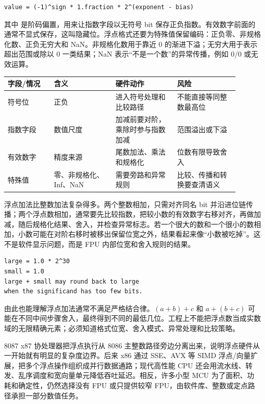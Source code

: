 \begin{lstlisting}
value = (-1)^sign * 1.fraction * 2^(exponent - bias)
\end{lstlisting}

其中  是阶码偏置，用来让指数字段以无符号 bit 保存正负指数。有效数字前面的  通常不显式保存，这叫隐藏位。浮点格式还要为特殊值保留编码：正负零、非规格化数、正负无穷大和 NaN。非规格化数用于靠近 0 的渐进下溢；无穷大用于表示超出范围或除以 0 一类结果；NaN 表示“不是一个数”的异常传播，例如 $0/0$ 或无效运算。

\begin{longtable}{L{0.18\linewidth}L{0.24\linewidth}L{0.24\linewidth}L{0.24\linewidth}}
\toprule
字段/情况 & 含义 & 硬件动作 & 风险 \\
\midrule
符号位 & 正负 & 进入符号处理和比较路径 & 不能直接等同整数最高位 \\
指数字段 & 数值尺度 & 加减前要对阶，乘除时参与指数加减 & 范围溢出或下溢 \\
有效数字 & 精度来源 & 尾数加法、乘法和规格化 & 位数有限导致舍入 \\
特殊值 & 零、非规格化、Inf、NaN & 需要旁路和异常规则 & 比较、传播和转换要查清语义 \\
\bottomrule
\end{longtable}

浮点加法比整数加法复杂得多。两个整数相加，只需对齐同名 bit 并沿进位链传播；两个浮点数相加，通常要先比较指数，把较小数的有效数字右移对齐，再做加减，随后规格化结果、舍入，并检查异常标志。若一个很大的数和一个很小的数相加，小数可能在对阶右移时被移出保留位宽之外，结果看起来像“小数被吃掉”。这不是软件显示问题，而是 FPU 内部位宽和舍入规则的结果。

\begin{lstlisting}
large = 1.0 * 2^30
small = 1.0
large + small may round back to large
when the significand has too few bits.
\end{lstlisting}

由此也能理解浮点加法通常不满足严格结合律。$(a+b)+c$ 和 $a+(b+c)$ 可能在不同中间步骤舍入，最终得到不同的最低几位。工程上不能把浮点数当成实数域的无限精确元素；必须知道格式位宽、舍入模式、异常处理和比较策略。

\begin{chipcase}
8087 x87 协处理器把浮点执行从 8086 主整数路径旁边分离出来，说明浮点硬件从一开始就有明显的复杂度边界。后来 x86 通过 SSE、AVX 等 SIMD 浮点/向量扩展，把多个浮点操作组织成并行数据通路；现代高性能 CPU 还会用流水线、转发、乱序调度和宽向量单元降低吞吐延迟。相反，许多小型 MCU 为了面积、功耗和确定性，仍然选择没有 FPU 或只提供较窄 FPU，由软件库、整数或定点路径承担一部分数值任务。
\end{chipcase}

